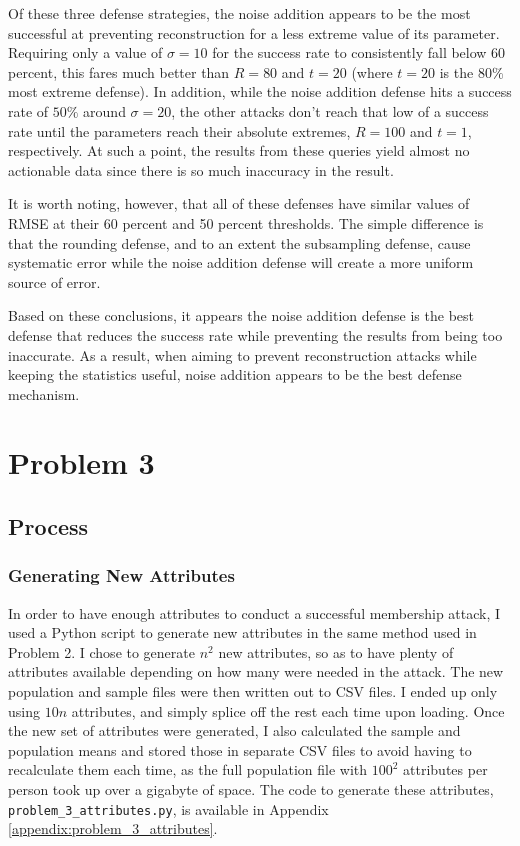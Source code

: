 \documentclass[12pt]{article}
\def\cl{\lstinline}
\begin{document}
\noindent

Of these three defense strategies, the noise addition appears to be the most successful at preventing reconstruction for a less extreme value of its parameter. Requiring only a value of $\sigma = 10$ for the success rate to consistently fall below 60 percent, this fares much better than $R = 80$ and $t = 20$ (where $t = 20$ is the $80\%$ most extreme defense). In addition, while the noise addition defense hits a success rate of $50\%$ around $\sigma = 20$, the other attacks don't reach that low of a success rate until the parameters reach their absolute extremes, $R = 100$ and $t = 1$, respectively. At such a point, the results from these queries yield almost no actionable data since there is so much inaccuracy in the result.

\medskip

It is worth noting, however, that all of these defenses have similar values of RMSE at their 60 percent and 50 percent thresholds. The simple difference is that the rounding defense, and to an extent the subsampling defense, cause systematic error while the noise addition defense will create a more uniform source of error.

\medskip

Based on these conclusions, it appears the noise addition defense is the best defense that reduces the success rate while preventing the results from being too inaccurate. As a result, when aiming to prevent reconstruction attacks while keeping the statistics useful, noise addition appears to be the best defense mechanism.

\newpage

\section{Problem 3}

\subsection{Process}

\subsubsection{Generating New Attributes}

\noindent

In order to have enough attributes to conduct a successful membership attack, I used a Python script to generate new attributes in the same method used in Problem 2. I chose to generate $n^2$ new attributes, so as to have plenty of attributes available depending on how many were needed in the attack. The new population and sample files were then written out to CSV files. I ended up only using $10n$ attributes, and simply splice off the rest each time upon loading. Once the new set of attributes were generated, I also calculated the sample and population means and stored those in separate CSV files to avoid having to recalculate them each time, as the full population file with $100^2$ attributes per person took up over a gigabyte of space. The code to generate these attributes, \cl{problem_3_attributes.py}, is available in Appendix \ref{appendix:problem_3_attributes}.
\end{document}

